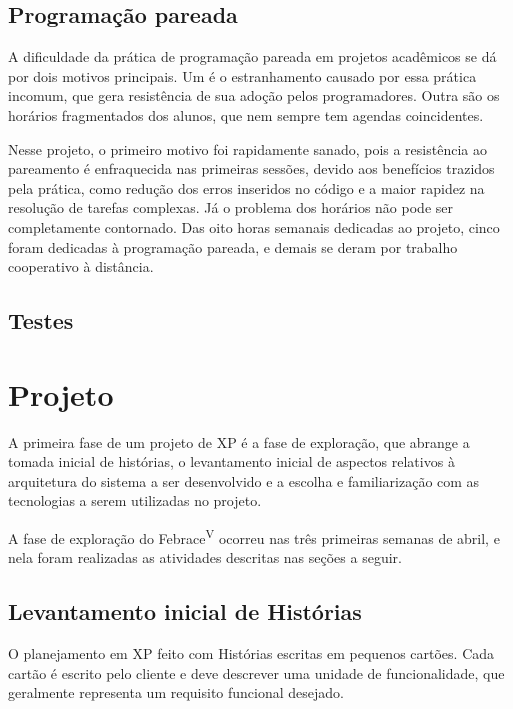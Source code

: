   \subsection{Programação pareada}
    A dificuldade da prática de programação pareada em projetos acadêmicos se dá por dois motivos principais. Um é o estranhamento causado por essa prática incomum, que gera resistência de sua adoção pelos programadores. Outra são os horários fragmentados dos alunos, que nem sempre tem agendas coincidentes.

    Nesse projeto, o primeiro motivo foi rapidamente sanado, pois a resistência ao pareamento é enfraquecida nas primeiras sessões, devido aos benefícios trazidos pela prática, como redução dos erros inseridos no código e a maior rapidez na resolução de tarefas complexas. Já o problema dos horários não pode ser completamente contornado. Das oito horas semanais dedicadas ao projeto, cinco foram dedicadas à programação pareada, e demais se deram por trabalho cooperativo à distância.

  \subsection{Testes}

\section{Projeto}

  A primeira fase de um projeto de XP é a fase de exploração\cite{beck04}, que abrange a tomada inicial de histórias, o levantamento inicial de aspectos relativos à arquitetura do sistema a ser desenvolvido e a escolha e familiarização com as tecnologias a serem utilizadas no projeto.

  A fase de exploração do Febrace\textsuperscript{V} ocorreu nas três primeiras semanas de abril, e nela foram realizadas as atividades descritas nas seções a seguir.

  \subsection{Levantamento inicial de Histórias}

    O planejamento em XP feito com Histórias escritas em pequenos cartões. Cada cartão é escrito pelo cliente e deve descrever uma unidade de funcionalidade, que geralmente representa um requisito funcional desejado\cite{sato07}.

